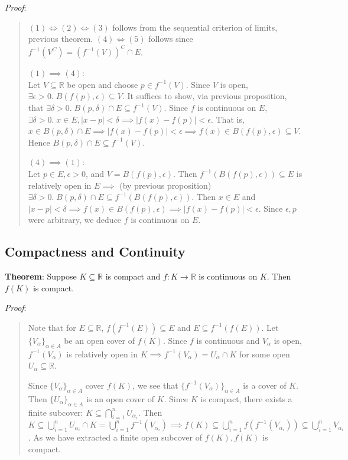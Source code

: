 \documentclass[11pt]{article}
\begin{document}
\emph{Proof}:
\begin{quote}\vspace{-0.3cm}
$(1) \iff (2) \iff (3)$ follows from the sequential criterion of limits, previous theorem. $(4) \iff (5)$ follows since $f^{-1}(V^C) = (f^{-1}(V))^C \cap E$.

$(1) \implies (4)$:\\
Let $V \subseteq \mathbb{R}$ be open and choose $p \in f^{-1}(V)$. Since $V$ is open, $\exists \epsilon > 0.\; B(f(p), \epsilon) \subseteq V$. It suffices to show, via previous proposition, that $\exists \delta > 0.\; B(p, \delta) \cap E \subseteq f^{-1}(V)$. Since $f$ is continuous on $E$, $\exists \delta > 0.\; x \in E, |x-p| < \delta \implies |f(x) - f(p)| < \epsilon$. That is, $x \in B(p, \delta) \cap E \implies |f(x) - f(p)| < \epsilon \implies f(x) \in B(f(p), \epsilon) \subseteq V$. Hence $B(p, \delta) \cap E \subseteq f^{-1}(V)$.

$(4) \implies (1)$:\\
Let $p \in E, \epsilon > 0$, and $V = B(f(p), \epsilon)$. Then $f^{-1}(B(f(p), \epsilon)) \subseteq E$ is relatively open in $E \implies$ (by previous proposition) $\exists \delta > 0.\; B(p, \delta) \cap E \subseteq f^{-1}(B(f(p), \epsilon))$. Then $x \in E$ and $|x-p| < \delta \implies f(x) \in B(f(p), \epsilon) \implies |f(x) - f(p)| < \epsilon$. Since $\epsilon, p$ were arbitrary, we deduce $f$ is continuous on $E$.
\end{quote}

\subsection{Compactness and Continuity}

\textbf{Theorem}: Suppose $K \subseteq \mathbb{R}$ is compact and $f : K \to \mathbb{R}$ is continuous on $K$. Then $f(K)$ is compact.

\emph{Proof}:
\begin{quote}\vspace{-0.3cm}
Note that for $E \subseteq \mathbb{R}$, $f(f^{-1}(E)) \subseteq E$ and $E \subseteq f^{-1}(f(E))$. Let $\{V_\alpha\}_{\alpha \in A}$ be an open cover of $f(K)$. Since $f$ is continuous and $V_\alpha$ is open, $f^{-1}(V_\alpha)$ is relatively open in $K \implies f^{-1}(V_\alpha) = U_\alpha \cap K$ for some open $U_\alpha \subseteq \mathbb{R}$.

Since $\{V_\alpha\}_{\alpha \in A}$ cover $f(K)$, we see that $\{f^{-1}(V_\alpha)\}_{\alpha \in A}$ is a cover of $K$. Then $\{U_\alpha\}_{\alpha \in A}$ is an open cover of $K$. Since $K$ is compact, there exists a finite subcover: $K \subseteq \bigcap_{i=1}^n U_{\alpha_i}$. Then $K \subseteq \bigcup_{i=1}^n U_{\alpha_i} \cap K = \bigcup_{i=1}^n f^{-1}(V_{\alpha_i}) \implies f(K) \subseteq \bigcup_{i=1}^n f(f^{-1}(V_{\alpha_i})) \subseteq \bigcup_{i=1}^n V_{\alpha_i}$. As we have extracted a finite open subcover of $f(K), f(K)$ is compact.
\end{quote}
\end{document}
